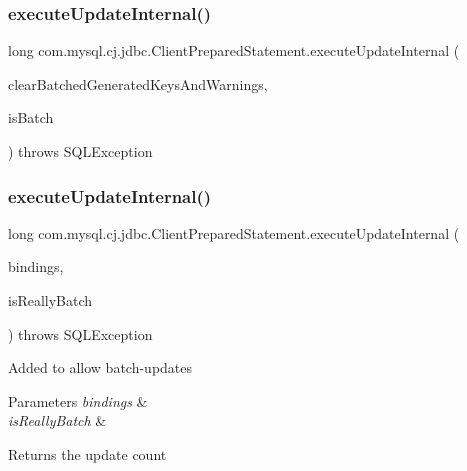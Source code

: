 \subsubsection{\texorpdfstring{execute\+Update\+Internal()}{executeUpdateInternal()}\hspace{0.1cm}{\footnotesize\ttfamily [1/2]}}
{\footnotesize\ttfamily long com.\+mysql.\+cj.\+jdbc.\+Client\+Prepared\+Statement.\+execute\+Update\+Internal (\begin{DoxyParamCaption}\item[{boolean}]{clear\+Batched\+Generated\+Keys\+And\+Warnings,  }\item[{boolean}]{is\+Batch }\end{DoxyParamCaption}) throws S\+Q\+L\+Exception\hspace{0.3cm}{\ttfamily [protected]}}

\mbox{\label{classcom_1_1mysql_1_1cj_1_1jdbc_1_1_client_prepared_statement_ababbfe9c3963f27842243160c2464af1}} 
\subsubsection{\texorpdfstring{execute\+Update\+Internal()}{executeUpdateInternal()}\hspace{0.1cm}{\footnotesize\ttfamily [2/2]}}
{\footnotesize\ttfamily long com.\+mysql.\+cj.\+jdbc.\+Client\+Prepared\+Statement.\+execute\+Update\+Internal (\begin{DoxyParamCaption}\item[{\mbox{\hyperlink{interfacecom_1_1mysql_1_1cj_1_1_query_bindings}{Query\+Bindings}}$<$?$>$}]{bindings,  }\item[{boolean}]{is\+Really\+Batch }\end{DoxyParamCaption}) throws S\+Q\+L\+Exception\hspace{0.3cm}{\ttfamily [protected]}}

Added to allow batch-\/updates


\begin{DoxyParams}{Parameters}
{\em bindings} & \\
\hline
{\em is\+Really\+Batch} & \\
\hline
\end{DoxyParams}
\begin{DoxyReturn}{Returns}
the update count
\end{DoxyReturn}


